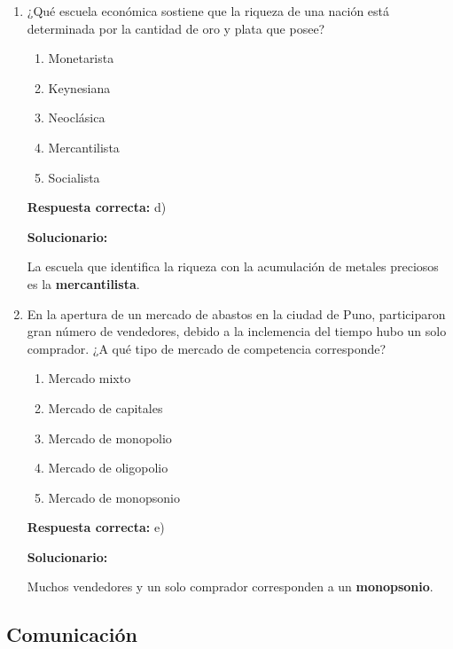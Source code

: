 \begin{enumerate}[resume]
	
	\item ¿Qué escuela económica sostiene que la riqueza de una nación está determinada por la cantidad de oro y plata que posee?
	\begin{enumerate}[label=\alph*)]
		\item Monetarista
		\item Keynesiana
		\item Neoclásica
		\item Mercantilista
		\item Socialista
	\end{enumerate}
	\textbf{Respuesta correcta:} d)
	
	\vspace{2mm}
	\textbf{Solucionario:}
	
	La escuela que identifica la riqueza con la acumulación de metales preciosos es la \textbf{mercantilista}.
	
	\vspace{6mm}
	
	\item En la apertura de un mercado de abastos en la ciudad de Puno, participaron gran número de vendedores, debido a la inclemencia del tiempo hubo un solo comprador. ¿A qué tipo de mercado de competencia corresponde?
	\begin{enumerate}[label=\alph*)]
		\item Mercado mixto
		\item Mercado de capitales
		\item Mercado de monopolio
		\item Mercado de oligopolio
		\item Mercado de monopsonio
	\end{enumerate}
	\textbf{Respuesta correcta:} e)
	
	\vspace{2mm}
	\textbf{Solucionario:}
	
	Muchos vendedores y un solo comprador corresponden a un \textbf{monopsonio}.
	
	\vspace{6mm}
	
\end{enumerate}

\subsection*{Comunicación}

